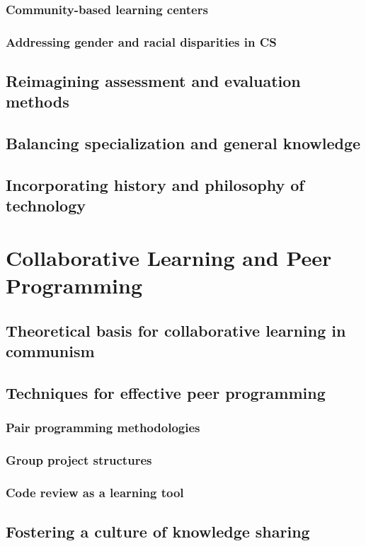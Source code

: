 \subsubsection{Community-based learning centers}
\subsubsection{Addressing gender and racial disparities in CS}
\subsection{Reimagining assessment and evaluation methods}
\subsection{Balancing specialization and general knowledge}
\subsection{Incorporating history and philosophy of technology}

\newpage

\section{Collaborative Learning and Peer Programming}
\subsection{Theoretical basis for collaborative learning in communism}
\subsection{Techniques for effective peer programming}
\subsubsection{Pair programming methodologies}
\subsubsection{Group project structures}
\subsubsection{Code review as a learning tool}
\subsection{Fostering a culture of knowledge sharing}
